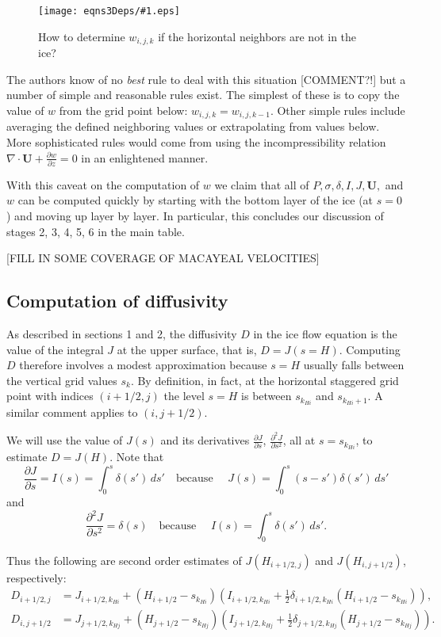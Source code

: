 \documentclass{amsart}%
\theoremstyle{plain}
\theoremstyle{definition}
\theoremstyle{remark}
\newcommand{\regfigure}[2]{\texttt{[image: eqns3Deps/\#1.eps]}}
\newcommand{\ddz}[1]{\ensuremath{\frac{\partial #1}{\partial z}}}
\newcommand{\dds}[1]{\ensuremath{\frac{\partial #1}{\partial s}}}
\newcommand{\dddsds}[1]{\ensuremath{\frac{\partial^2 #1}{\partial s^2}}}
\newcommand{\diverg}{\nabla\cdot}
\newcommand{\bU}{{\mathbf{U}}}
\begin{document}
\begin{figure}[ht]
\vspace{-4mm}
\regfigure{bdrywsitfig}{2.5}
\vspace{-6mm}
\caption{How to determine $w_{i,j,k}$ if the horizontal neighbors are not in the ice?}
\label{bdrywsit}
\end{figure}

The authors know of no \emph{best} rule to deal with this situation [COMMENT?!] but a number of simple and reasonable rules exist.  The simplest of these is to copy the value of $w$ from the grid point below: $w_{i,j,k}=w_{i,j,k-1}$.  Other simple rules include averaging the defined neighboring values or extrapolating from values below.  More sophisticated rules would come from using the incompressibility relation $\diverg \bU+\ddz{w}=0$ in an enlightened manner.

With this caveat on the computation of $w$ we claim that all of $P, \sigma, \delta, I, J, \bU,$ and $w$ can be computed quickly by starting with the bottom layer of the ice (at $s=0$) and moving up layer by layer.  In particular, this concludes our discussion of stages 2, 3, 4, 5, 6 in the main table.

[FILL IN SOME COVERAGE OF MACAYEAL VELOCITIES]

\subsection{Computation of diffusivity}  As described in sections 1 and 2, the diffusivity $D$ in the ice flow equation is the value of the integral $J$ at the upper surface, that is, $D=J(s=H)$.  Computing $D$ therefore involves a modest approximation because $s=H$ usually falls between the vertical grid values $s_k$.  By definition, in fact, at the horizontal staggered grid point with indices $(i+1/2,j)$ the level $s=H$ is between $s_{k_{Hi}}$ and $s_{k_{Hi}+1}$.  A similar comment applies to $(i,j+1/2)$.

We will use the value of $J(s)$ and its derivatives $\dds{J}$, $\dddsds{J}$, all at $s=s_{k_{Hi}}$, to estimate $D=J(H)$.  Note that
    $$\dds{J} = I(s) = \int_0^s \delta(s')\,ds' \quad \text{because } \quad J(s) = \int_0^s (s-s') \delta(s')\,ds'$$
and
    $$\dddsds{J}=\delta(s) \quad \text{because } \quad I(s) = \int_0^s \delta(s')\,ds'.$$

Thus the following are second order estimates of $J(H_{i+1/2,j})$ and $J(H_{i,j+1/2})$, respectively:
\begin{align}
D_{i+1/2,j}&=J_{i+1/2,k_{Hi}} + (H_{i+1/2}-s_{k_{Hi}}) \left(I_{i+1/2,k_{Hi}} + \frac{1}{2} \delta_{i+1/2,k_{Hi}} (H_{i+1/2}-s_{k_{Hi}})\right), \\
D_{i,j+1/2}&=J_{j+1/2,k_{Hj}} + (H_{j+1/2}-s_{k_{Hj}}) \left(I_{j+1/2,k_{Hj}} + \frac{1}{2} \delta_{j+1/2,k_{Hj}} (H_{j+1/2}-s_{k_{Hj}})\right).
\end{align}
\end{document}

